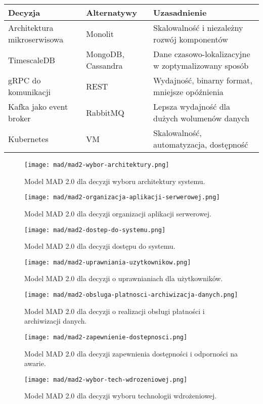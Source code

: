 \documentclass[a4paper,12pt]{article}
\theoremstyle{definition}
\begin{document}
\begin{tabular}{|p{4cm}|p{4cm}|p{7cm}|}
\hline
\textbf{Decyzja} & \textbf{Alternatywy} & \textbf{Uzasadnienie} \\
\hline
Architektura mikroserwisowa & Monolit & Skalowalność i niezależny rozwój komponentów \\
\hline
TimescaleDB & MongoDB, Cassandra & Dane czasowo-lokalizacyjne w zoptymalizowany sposób \\
\hline
gRPC do komunikacji & REST & Wydajność, binarny format, mniejsze opóźnienia \\
\hline
Kafka jako event broker & RabbitMQ & Lepsza wydajność dla dużych wolumenów danych \\
\hline
Kubernetes & VM & Skalowalność, automatyzacja, dostępność \\
\hline
\end{tabular}

\begin{figure}[h]
	\centering \texttt{[image: mad/mad2-wybor-architektury.png]}
	\caption{Model MAD 2.0 dla decyzji wyboru architektury systemu.}
    \label{fig:csr}
\end{figure}

\begin{figure}[h]
	\centering \texttt{[image: mad/mad2-organizacja-aplikacji-serwerowej.png]}
	\caption{Model MAD 2.0 dla decyzji organizacji aplikacji serwerowej.}
    \label{fig:csr}
\end{figure}

\begin{figure}[h]
	\centering \texttt{[image: mad/mad2-dostep-do-systemu.png]}
	\caption{Model MAD 2.0 dla decyzji dostępu do systemu.}
    \label{fig:csr}
\end{figure}

\begin{figure}[h]
	\centering \texttt{[image: mad/mad2-uprawniania-uzytkownikow.png]}
	\caption{Model MAD 2.0 dla decyzji o uprawnianiach dla użytkowników.}
    \label{fig:csr}
\end{figure}

\begin{figure}[h]
	\centering \texttt{[image: mad/mad2-obsluga-platnosci-archiwizacja-danych.png]}
	\caption{Model MAD 2.0 dla decyzji o realizacji obsługi płatności i archiwizacji danych.}
    \label{fig:csr}
\end{figure}

\begin{figure}[h]
	\centering \texttt{[image: mad/mad2-zapewnienie-dostepnosci.png]}
	\caption{Model MAD 2.0 dla decyzji zapewnienia dostępności i odporności na awarie.}
    \label{fig:csr}
\end{figure}

\begin{figure}[h]
	\centering \texttt{[image: mad/mad2-wybor-tech-wdrozeniowej.png]}
	\caption{Model MAD 2.0 dla decyzji wyboru technologii wdrożeniowej.}
    \label{fig:csr}
\end{figure}
\end{document}

